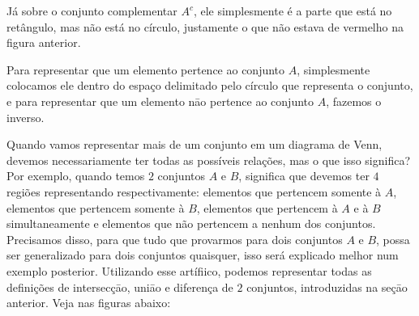     
    Já sobre o conjunto complementar $A^c$, ele simplesmente é a parte que está no retângulo, mas não está no círculo, justamente o que não estava de vermelho na figura anterior.
    
    
    Para representar que um elemento pertence ao conjunto $A$, simplesmente colocamos ele dentro do espaço delimitado pelo círculo que representa o conjunto, e para representar que um elemento nāo pertence ao conjunto $A$, fazemos o inverso.
    
    
    
    Quando vamos representar mais de um conjunto em um diagrama de Venn, devemos necessariamente ter todas as possíveis relações, mas o que isso significa? Por exemplo, quando temos $2$ conjuntos $A$ e $B$, significa que devemos ter $4$ regiões representando respectivamente: elementos que pertencem somente à $A$, elementos que pertencem somente à $B$, elementos que pertencem à $A$ e à $B$ simultaneamente e elementos que não pertencem a nenhum dos conjuntos. Precisamos disso, para que tudo que provarmos para dois conjuntos $A$ e $B$, possa ser generalizado para dois conjuntos quaisquer, isso será explicado melhor num exemplo posterior.
    Utilizando esse artífiico, podemos representar todas as definições de intersecçāo, uniāo e diferença de $2$ conjuntos, introduzidas na seçāo anterior. Veja nas figuras abaixo:
    
    
